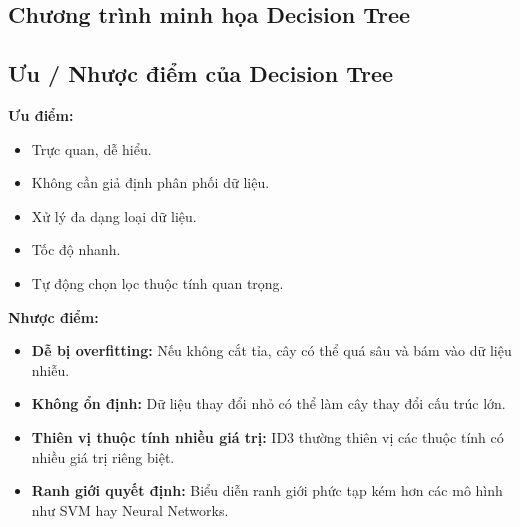 \subsection{Chương trình minh họa Decision Tree}


\subsection{Ưu / Nhược điểm của Decision Tree}
\textbf{Ưu điểm:}
\begin{itemize}
    \item Trực quan, dễ hiểu.
    \item Không cần giả định phân phối dữ liệu.
    \item Xử lý đa dạng loại dữ liệu.
    \item Tốc độ nhanh.
    \item Tự động chọn lọc thuộc tính quan trọng.
\end{itemize}

\textbf{Nhược điểm:}
\begin{itemize}
    \item \textbf{Dễ bị overfitting:} Nếu không cắt tỉa, cây có thể quá sâu và bám vào dữ liệu nhiễu.
    \item \textbf{Không ổn định:} Dữ liệu thay đổi nhỏ có thể làm cây thay đổi cấu trúc lớn.
    \item \textbf{Thiên vị thuộc tính nhiều giá trị:} ID3 thường thiên vị các thuộc tính có nhiều giá trị riêng biệt.
    \item \textbf{Ranh giới quyết định:} Biểu diễn ranh giới phức tạp kém hơn các mô hình như SVM hay Neural Networks.
\end{itemize}